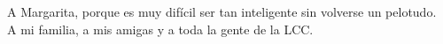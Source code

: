 A Margarita, porque es muy difícil ser tan inteligente sin volverse un pelotudo.\\
A mi familia, a mis amigas y a toda la gente de la LCC.
